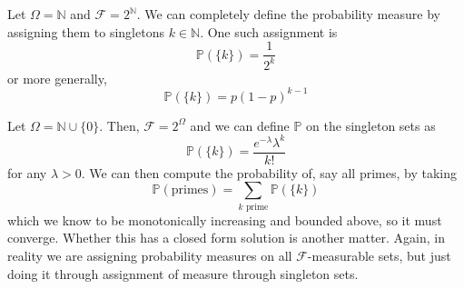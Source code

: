     \begin{example}
      Let $\Omega = \mathbb{N}$ and $\mathcal{F} = 2^\mathbb{N}$. We can completely define the probability measure by assigning them to singletons $k \in \mathbb{N}$. One such assignment is 
      \begin{equation}
        \mathbb{P}(\{k\}) = \frac{1}{2^k}
      \end{equation}
      or more generally, 
      \begin{equation}
        \mathbb{P}(\{k\}) = p (1 - p)^{k-1}
      \end{equation}
    \end{example}

    \begin{example}
      Let $\Omega = \mathbb{N} \cup \{0\}$. Then, $\mathcal{F} = 2^\Omega$ and we can define $\mathbb{P}$ on the singleton sets as 
      \begin{equation}
        \mathbb{P}(\{k\}) = \frac{e^{-\lambda} \lambda^k}{k!}
      \end{equation}
      for any $\lambda > 0$. We can then compute the probability of, say all primes, by taking 
      \begin{equation}
        \mathbb{P}(\text{primes}) = \sum_{k \text{ prime}} \mathbb{P}(\{k\})
      \end{equation}
      which we know to be monotonically increasing and bounded above, so it must converge. Whether this has a closed form solution is another matter. Again, in reality we are assigning probability measures on all $\mathcal{F}$-measurable sets, but just doing it through assignment of measure through singleton sets. 
    \end{example}
    
